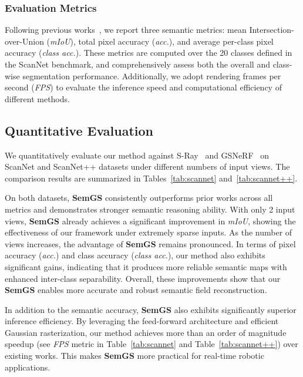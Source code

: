 \documentclass[letterpaper, 10 pt, conference]{ieeeconf}  %
\begin{document}
\subsubsection{Evaluation Metrics}
Following previous works~\cite{S-Ray, GSNeRF}, we report three semantic metrics: mean Intersection-over-Union (\textit{mIoU}), total pixel accuracy (\textit{acc.}), and average per-class pixel accuracy (\textit{class acc.}). These metrics are computed over the 20 classes defined in the ScanNet benchmark, and comprehensively assess both the overall and class-wise segmentation performance. Additionally, we adopt rendering frames per second (\textit{FPS}) to evaluate the inference speed and computational efficiency of different methods.

\subsection{Quantitative Evaluation}
We quantitatively evaluate our method against S-Ray~\cite{S-Ray} and GSNeRF~\cite{GSNeRF} on ScanNet and ScanNet++ datasets under different numbers of input views. The comparison results are summarized in Tables~\ref{tab:scannet} and~\ref{tab:scannet++}.

On both datasets, \textbf{SemGS} consistently outperforms prior works across all metrics and demonstrates stronger semantic reasoning ability.
With only 2 input views, \textbf{SemGS} already achieves a significant improvement in \textit{mIoU}, showing the effectiveness of our framework under extremely sparse inputs. As the number of views increases, the advantage of \textbf{SemGS} remains pronounced. In terms of pixel accuracy (\textit{acc.}) and class accuracy (\textit{class acc.}), our method also exhibits significant gains, indicating that it produces more reliable semantic maps with enhanced inter-class separability. Overall, these improvements show that our \textbf{SemGS} enables more accurate and robust semantic field reconstruction.

In addition to the semantic accuracy, \textbf{SemGS} also exhibits significantly superior inference efficiency. By leveraging the feed-forward architecture and efficient Gaussian rasterization, our method achieves more than an order of magnitude speedup (see \textit{FPS} metric in Table~\ref{tab:scannet} and Table~\ref{tab:scannet++}) over existing works. This makes \textbf{SemGS} more practical for real-time robotic applications.
\end{document}
